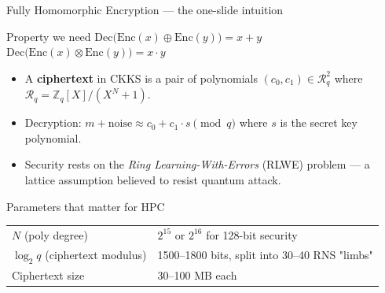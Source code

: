 \documentclass[aspectratio=169]{beamer}
\begin{document}
\begin{frame}{Fully Homomorphic Encryption — the one-slide intuition}
  \begin{block}{Property we need}
    $\mathrm{Dec}\big(\mathrm{Enc}(x) \oplus \mathrm{Enc}(y)\big) = x + y$ \qquad
    $\mathrm{Dec}\big(\mathrm{Enc}(x) \otimes \mathrm{Enc}(y)\big) = x \cdot y$
  \end{block}
  \vspace{0.3em}
  \begin{itemize}
    \item A \textbf{ciphertext} in CKKS is a pair of polynomials
          $(c_0, c_1) \in \mathcal{R}_q^2$ where
          $\mathcal{R}_q = \mathbb{Z}_q[X] / (X^N + 1)$.
    \item Decryption: $m + \mathrm{noise} \approx c_0 + c_1 \cdot s \pmod{q}$
          where $s$ is the secret key polynomial.
    \item Security rests on the \emph{Ring Learning-With-Errors} (RLWE) problem —
          a lattice assumption believed to resist quantum attack.
  \end{itemize}
  \vspace{0.5em}
  \begin{block}{Parameters that matter for HPC}
    \footnotesize
    \begin{tabular}{@{}ll@{}}
      $N$ (poly degree) & $2^{15}$ or $2^{16}$ for 128-bit security \\
      $\log_2 q$ (ciphertext modulus) & 1500--1800 bits, split into 30--40 RNS "limbs" \\
      Ciphertext size & 30--100 MB each \\
    \end{tabular}
  \end{block}
\end{frame}
\end{document}
